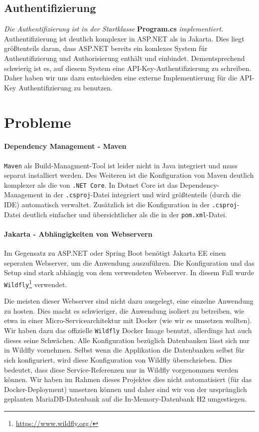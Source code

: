 \subsection{Authentifizierung}

\textit{Die Authentifizierung ist in der Startklasse} \textbf{Program.cs} \textit{implementiert.}\\

Authentifizierung ist deutlich komplexer in ASP.NET als in Jakarta. Dies liegt größtenteils daran,
dass ASP.NET bereits ein komlexes System für Authentifizierung und Authorisierung enthält und einbindet. 
Dementsprechend schwierig ist es, auf diesem System eine API-Key-Authentifizierung zu schreiben. 
Daher haben wir uns dazu entschieden eine externe Implementierung für die API-Key Authentifizierung zu benutzen.

\section{Probleme}

\paragraph{Dependency Management - Maven}

\texttt{Maven} als Build-Managment-Tool ist leider nicht in Java integriert und muss separat installiert werden.
Des Weiteren ist die Konfiguration von Maven deutlich komplexer als die von \texttt{.NET Core}.
In Dotnet Core ist das Dependency-Management in der \texttt{.csproj}-Datei integriert und wird größtenteils (durch die IDE) automatisch verwaltet.
Zusätzlich ist die Konfiguration in der \texttt{.csproj}-Datei deutlich einfacher und übersichtlicher als die in der \texttt{pom.xml}-Datei.

\paragraph{Jakarta - Abhängigkeiten von Webservern}

Im Gegensatz zu ASP.NET oder Spring Boot benötigt Jakarta EE einen seperaten Webserver, um die Anwendung auszuführen. 
Die Konfiguration und das Setup sind stark abhängig von dem verwendeten Webserver. 
In diesem Fall wurde \texttt{Wildfly}\footnote{\url{https://www.wildfly.org/}} verwendet.

Die meisten dieser Webserver sind nicht dazu ausgelegt, eine einzelne Anwendung zu hosten.
Dies macht es schwieriger, die Anwendung isoliert zu betreiben, 
wie etwa in einer Micro-Servicearchitektur mit Docker (wie wir es umsetzen wollten).
Wir haben dazu das offizielle \texttt{Wildfly} Docker Image benutzt,
 allerdings hat auch dieses seine Schwächen.
Alle Konfiguration bezüglich Datenbanken lässt sich nur in Wildfly vornehmen.
Selbst wenn die Applikation die Datenbanken selbst für sich konfiguriert, wird diese Konfiguration von Wildfly überschrieben.
Dies bedeutet, dass diese Service-Referenzen nur in Wildfly vorgenommen werden können.
Wir haben im Rahmen dieses Projektes dies nicht automatisiert (für das Docker-Deployment) umsetzen können
und daher sind wir von der ursprünglich geplanten MariaDB-Datenbank auf die In-Memory-Datenbank H2 umgestiegen.
